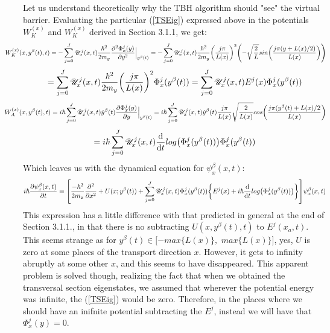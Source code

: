 \documentclass[11pt, a4paper]{article} %
\newcommand{\U}{\mathscr{U}}
\begin{document}
Let us understand theoretically why the TBH algorithm should "see" the virtual barrier. Evaluating the particular (\ref{TSEig}) expressed above in the potentials $W_K^{(x)}$ and $W_K^{(x)}$ derived in Section 3.1.1, we get:
$$
\hspace{-1cm} W_K^{(x)}(x,y^\beta(t),t)= -\sum_{j=0}^J \U^j_x(x,t)\frac{\hbar^2}{2m_y}\pdv[2]{\Phi^j_x(y)}{y}\Big\rvert_{y^\beta(t)} = -\sum_{j=0}^J \U^j_x(x,t)\frac{\hbar^2}{2m_y}\qty(\frac{j\pi}{L(x)})^2\qty(- \sqrt{\frac{2}{L}} sin\qty( \frac{j\pi (y+L(x)/2)}{L(x)} ))
$$
$$
=\sum_{j=0}^J  \U^j_x(x,t)\frac{\hbar^2}{2m_y}\qty(\frac{j\pi}{L(x)})^2 \Phi^j_x(y^\beta(t))= \sum_{j=0}^J  \U^j_x(x,t)E^j(x) \Phi^j_x(y^\beta(t))
$$
$$
\hspace{-1cm} W_A^{(x)}(x,y^\beta(t),t)=i\hbar\sum_{j=0}^J \U^j_x(x,t)\dot{y}^\beta(t)\pdv{\Phi^j_x(y)}{y}\Big\rvert_{y^\beta(t)}= i\hbar\sum_{j=0}^J \U^j_x(x,t)\dot{y}^\beta(t) \frac{j\pi}{L(x)} \sqrt{\frac{2}{L(x)}}cos\qty(\frac{j\pi (y^\beta(t)+L(x)/2}{L(x)})
$$
$$
=i\hbar \sum_{j=0}^J\U^j_x(x,t) \dv{}{t}log\qty(\Phi^j_x(y^\beta(t))) \Phi^j_x(y^\beta(t))
$$%
Which leaves us with the dynamical equation for $\psi^\beta_x(x,t)$:
$$
i\hbar \pdv{\psi^\beta_x(x,t)}{t}=\qty[ \frac{-\hbar^2}{2m_x}\pdv[2]{}{x} + U(x;y^\beta(t))+\sum_{j=0}^J \U^j_x(x,t)\Phi^j_x(y^\beta(t))\qty{ E^j(x)+i\hbar\dv{}{t}log\qty(\Phi^j_x(y^\beta(t)))} ]\psi^\beta_x(x,t)
$$
This expression has a little difference with that predicted in general at the end of Section 3.1.1., in that there is no subtracting $U(x,y^\beta(t),t)$ to $E^j(x_a,t)$. This seems strange as for $y^\beta(t)\in [-max\{L(x)\},$ $max\{L(x)\}]$, yes, $U$ is zero at some places of the transport direction $x$. However, it gets to infinity abruptly at some other $x$, and this seems to have disappeared. This apparent problem is solved though, realizing the fact that when we obtained the transversal section eigenstates, we assumed that wherever the potential energy was infinite, the (\ref{TSEig}) would be zero. Therefore, in the places where we should have an inifnite potential subtracting the $E^j$, instead we will have that $\Phi^j_x(y)=0$.
\end{document}

